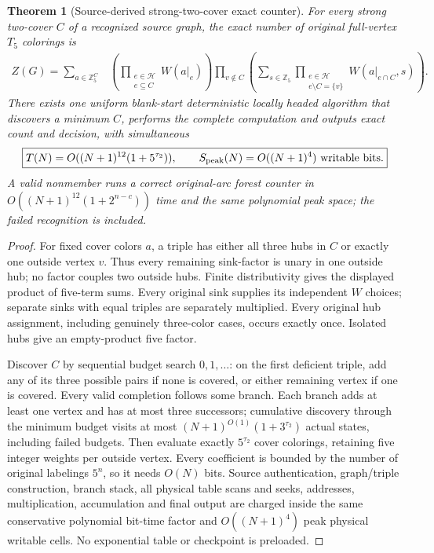 \documentclass[11pt]{article}
\newtheorem{theorem}{Theorem}
\begin{document}
\begin{theorem}[Source-derived strong-two-cover exact counter]
For every strong two-cover $C$ of a recognized source graph,
the exact number of \emph{original full-vertex} $T_5$ colorings is
\[
\begin{split}
 Z(G)=\sum_{a\in\mathbb Z_5^C}
 &\left(\prod_{\substack{e\in\mathcal H\\e\subseteq C}}
 W(a|_e)\right)
 \prod_{v\notin C}
 \left(\sum_{s\in\mathbb Z_5}
 \prod_{\substack{e\in\mathcal H\\e\setminus C=\{v\}}}
 W(a|_{e\cap C},s)\right).
\end{split}
\]
There exists one uniform blank-start deterministic locally headed
algorithm that discovers a minimum $C$, performs the complete
computation and outputs exact count and decision, with simultaneous
\[
 \boxed{T(N)=O((N+1)^{12}(1+5^{\tau_2})),\qquad
 S_{\rm peak}(N)=O((N+1)^4)\text{ writable bits}.}
\]
A valid nonmember runs a correct original-arc forest counter
in $O((N+1)^{12}(1+2^{n-c}))$ time and the same
polynomial peak space; the failed recognition is included.
\end{theorem}
\begin{proof}
For fixed cover colors $a$, a triple has either all three
hubs in $C$ or exactly one outside vertex $v$. Thus every
remaining sink-factor is unary in one outside hub; no
factor couples two outside hubs. Finite distributivity
gives the displayed product of five-term sums.
Every original sink supplies its independent $W$ choices;
separate sinks with equal triples are separately multiplied.
Every original hub assignment, including genuinely three-color
cases, occurs exactly once. Isolated hubs give an empty-product
five factor.

Discover $C$ by sequential budget search $0,1,\ldots$:
on the first deficient triple, add any of its three possible
pairs if none is covered, or either remaining vertex if one
is covered. Every valid completion follows some branch.
Each branch adds at least one vertex and has at most three
successors; cumulative discovery through the minimum
budget visits at most $(N+1)^{O(1)}(1+3^{\tau_2})$
actual states, including failed budgets.
Then evaluate exactly $5^{\tau_2}$ cover colorings,
retaining five integer weights per outside vertex.
Every coefficient is bounded by the number of original
labelings $5^n$, so it needs $O(N)$ bits.
Source authentication, graph/triple construction,
branch stack, all physical table scans and seeks,
addresses, multiplication, accumulation and final
output are charged inside the same conservative
polynomial bit-time factor and $O((N+1)^4)$ peak
physical writable cells. No exponential table or
checkpoint is preloaded.
\end{proof}
\end{document}
